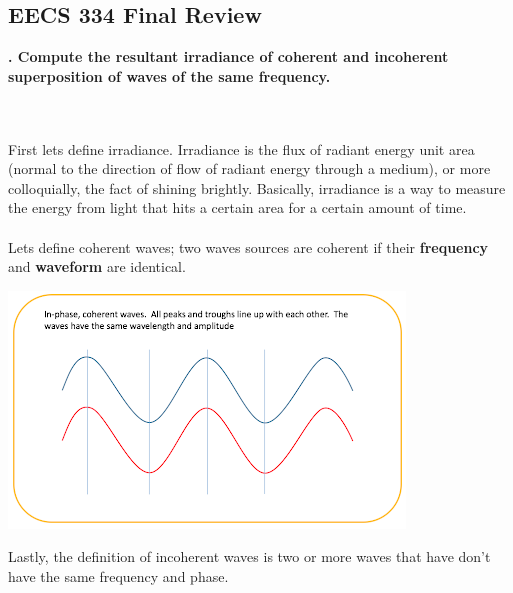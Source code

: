 \documentclass[12pt]{article}
\newcounter{counter}
\newcommand*{\question}[1]{
            \textbf{\thecounter. #1} \hfill
            \addtocounter{counter}{1}
            \\ \\
            }
\begin{document}
\begin{center}
    \section*{EECS 334 Final Review}
\end{center}
\question{Compute the resultant irradiance of coherent and incoherent superposition of waves of the same frequency.}
First lets define irradiance. Irradiance is the flux of radiant energy unit area (normal to the direction of flow of radiant energy through a medium), or more colloquially, the fact of shining brightly. Basically, irradiance is a way to measure the energy from light that hits a certain area for a certain amount of time.
\\ \\ 
Lets define coherent waves; two waves sources are coherent if their \textbf{frequency} and \textbf{waveform} are identical.
\begin{center}
    \includegraphics*[scale = 1]{imgs/coherent-wave.png}    
\end{center}

Lastly, the definition of incoherent waves is two or more waves that have don't have the same frequency and phase.
\end{document}
